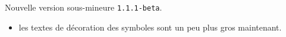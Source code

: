 Nouvelle version sous-mineure \verb+1.1.1-beta+.

\begin{itemize}[itemsep=.5em]
    \item {}
          les textes de décoration des symboles sont un peu plus gros maintenant.
\end{itemize}


\separation
